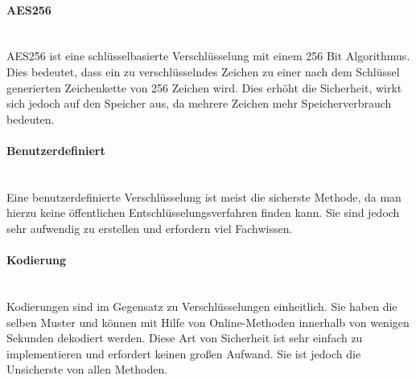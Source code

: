 \begin{indentE}\mbox{}
	\paragraph{AES256}\mbox{}\\
	AES256 ist eine schlüsselbasierte Verschlüsselung mit einem 256 Bit Algorithmus. Dies bedeutet, dass ein zu verschlüsselndes Zeichen zu einer nach dem Schlüssel generierten Zeichenkette von 256 Zeichen wird. Dies erhöht die Sicherheit, wirkt sich jedoch auf den Speicher aus, da mehrere Zeichen mehr Speicherverbrauch bedeuten.
	
	\paragraph{Benutzerdefiniert}\mbox{}\\
	Eine benutzerdefinierte Verschlüsselung ist meist die sicherste Methode, da man hierzu keine öffentlichen Entschlüsselungsverfahren finden kann. Sie sind jedoch sehr aufwendig zu erstellen und erfordern viel Fachwissen.
	
	\paragraph{Kodierung}\mbox{}\\
	Kodierungen sind im Gegensatz zu Verschlüsselungen einheitlich. Sie haben die selben Muster und können mit Hilfe von Online-Methoden innerhalb von wenigen Sekunden dekodiert werden. Diese Art von Sicherheit ist sehr einfach zu implementieren und erfordert keinen großen Aufwand. Sie ist jedoch die Unsicherste von allen Methoden.
	

\end{indentE}
